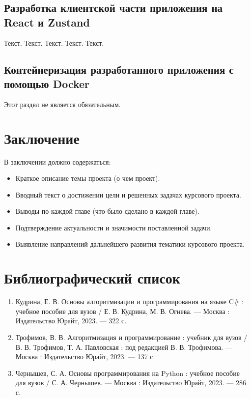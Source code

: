 \documentclass[a4paper,14pt]{extarticle}
\begin{document}
\subsection{Разработка клиентской части приложения на React и Zustand}
Текст. Текст. Текст. Текст. Текст.

\subsection{Контейнеризация разработанного приложения с помощью Docker}
Этот раздел не является обязательным.

\newpage
\section*{Заключение}
В заключении должно содержаться:
\begin{itemize}
    \item Краткое описание темы проекта (о чем проект).
    \item Вводный текст о достижении цели и решенных задачах курсового проекта.
    \item Выводы по каждой главе (что было сделано в каждой главе).
    \item Подтверждение актуальности и значимости поставленной задачи.
    \item Выявление направлений дальнейшего развития тематики курсового проекта.
\end{itemize}

\newpage
\section*{Библиографический список}
\begin{enumerate}
    \item Кудрина, Е. В. Основы алгоритмизации и программирования на языке C\# : учебное пособие для вузов / Е. В. Кудрина, М. В. Огнева. — Москва : Издательство Юрайт, 2023. — 322 с.
    \item Трофимов, В. В. Алгоритмизация и программирование : учебник для вузов / В. В. Трофимов, Т. А. Павловская ; под редакцией В. В. Трофимова. — Москва : Издательство Юрайт, 2023. — 137 с.
    \item Чернышев, С. А. Основы программирования на Python : учебное пособие для вузов / С. А. Чернышев. — Москва : Издательство Юрайт, 2023. — 286 с.
\end{enumerate}
\end{document}
